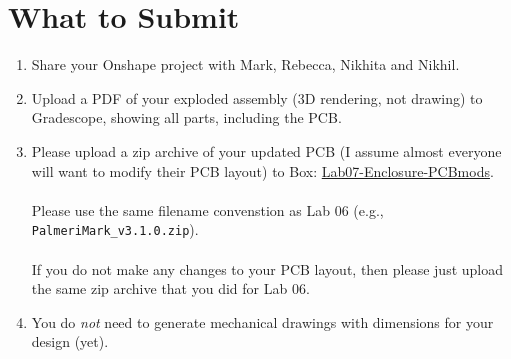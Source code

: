 \documentclass[10pt]{article}
\begin{document}
\section{What to Submit}
\begin{enumerate}
    \item Share your Onshape project with Mark, Rebecca, Nikhita and Nikhil.
    \item Upload a PDF of your exploded assembly (3D rendering, not drawing) to Gradescope, showing all
        parts, including the PCB.
    \item Please upload a zip archive of your updated PCB (I assume almost
        everyone will want to modify their PCB layout) to Box:
        \href{https://duke.box.com/s/byhnj190aegac09hg0gdr1j1x1hux02u}{Lab07-Enclosure-PCBmods}.\\\\
        Please use the same filename convenstion as Lab 06 (e.g.,
        \texttt{PalmeriMark\_v3.1.0.zip}).\\\\If you do not make any changes to
        your PCB layout, then please just upload the same zip archive that you
        did for Lab 06.
    \item You do \emph{not} need to generate mechanical drawings with
        dimensions for your design (yet).
\end{enumerate}
\end{document}
